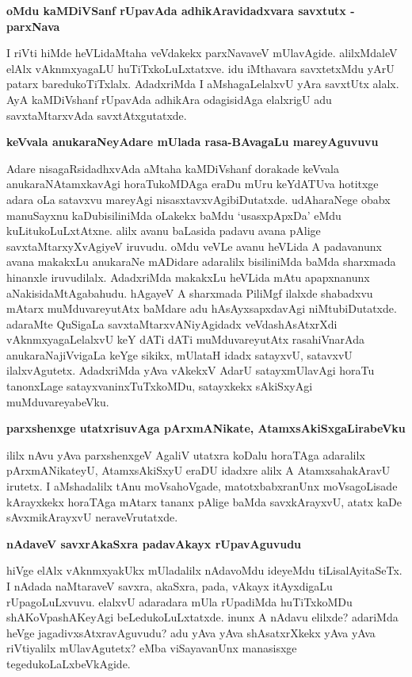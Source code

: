 {\bigskip
\noindent
{\large\bf oMdu kaMDiVSanf rUpavAda adhikAravidadxvara savxtutx - parxNava}}\label{page140}
\medskip

\noindent
I riVti hiMde heVLidaMtaha veVdakekx parxNavaveV mUlavAgide. alilxMdaleV elAlx vAknmxyagaLU huTiTxkoLuLxtatxve. idu iMthavara savxtetxMdu yArU patarx baredukoTiTxlalx. AdadxriMda I aMshagaLelalxvU yAra savxtUtx alalx. AyA kaMDiVshanf rUpavAda adhikAra odagisidAga elalxrigU adu savxtaMtarxvAda savxtAtxgutatxde.

{\bigskip
\noindent
{\large\bf keVvala anukaraNeyAdare mUlada rasa-BAvagaLu mareyAguvuvu}}\label{page141}
\medskip

\noindent
Adare nisagaRsidadhxvAda aMtaha kaMDiVshanf dorakade keVvala anukaraNAtamxkavAgi horaTukoMDAga eraDu mUru keYdATUva hotitxge adara oLa satavxvu mareyAgi nisasxtavxvAgibiDutatxde. udAhara\-Nege obabx manuSayxnu kaDubisiliniMda oLakekx baMdu `usasxpApxDa' eMdu kuLitukoLuLxtAtxne. alilx avanu baLa\-sida padavu avana pAlige savxtaMtarxyXvAgiyeV iruvudu. oMdu veVLe avanu heVLida A pada\-vanunx avana makakxLu anukaraNe mADidare adaralilx bisiliniMda baMda sharxmada hinanxle iruvudilalx. AdadxriMda makakxLu heVLida mAtu apapxnanunx aNakisidaMtAgabahudu. hAgayeV A sharxmada PiliMgf ilalxde shabadxvu\- mAtarx muMduvareyutAtx baMdare adu hAsAyxsapxdavAgi niMtubiDutatxde. adaraMte QuSigaLa savxtaMtarxvANi\-yAgidadx veVdashAsAtxrXdi vAknmxyagaLelalxvU keY dATi dATi muMduvareyutAtx rasahiVnarAda anukaraNa\-jiVvigaLa keYge sikikx, mUlataH idadx satayxvU, satavxvU ilalxvAgutetx. AdadxriMda yAva vAkekxV AdarU satayxmUla\-vAgi horaTu tanonxLage satayxvaninxTuTxkoMDu, satayxkekx sAkiSxyAgi muMduvareyabeVku.

{\bigskip
\noindent
{\large\bf parxshenxge utatxrisuvAga pArxmANikate, AtamxsAkiSxgaLirabeVku}}\label{page141}
\medskip

\noindent
ililx nAvu yAva parxshenxgeV AgaliV utatxra koDalu horaTAga adaralilx pArxmANikateyU, Atamx\-sAkiSxyU eraDU idadxre alilx A AtamxsahakAravU irutetx. I aMshadalilx tAnu moVsahoVgade, matotx\-babxranUnx moVsagoLisade kArayxkekx horaTAga mAtarx tananx pAlige baMda savxkArayxvU, atatx kaDe sAvxmi\-kArayxvU neraveVrutatxde.

{\bigskip
\noindent
{\large\bf nAdaveV savxrAkaSxra padavAkayx rUpavAguvudu}}\label{page141}
\medskip

\noindent
hiVge elAlx vAknmxyakUkx mUladalilx nAdavoMdu ideyeMdu tiLisalAyitaSeTx. I nAdada naMta\-raveV savxra, akaSxra, pada, vAkayx itAyxdigaLu rUpagoLuLxvuvu. elalxvU adaradara mUla rUpa\-diMda huTiTxkoMDu shAKoVpashAKeyAgi beLedukoLuLxtatxde. inunx A nAdavu elilxde? adariMda heVge jaga\-divxsAtxravAguvudu? adu yAva yAva shAsatxrXkekx yAva yAva riVtiyalilx mUlavAgutetx? eMba viSayavanUnx manasisxge tegedukoLaLxbeVkAgide.

